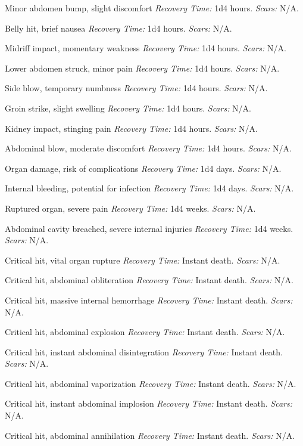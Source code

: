 \begin{description}[labelwidth=1.5em, leftmargin=*, itemsep=0.4em]
    \item[1 -] Minor abdomen bump, slight discomfort \textit{Recovery Time:} 1d4 hours. \textit{Scars:} N/A.
    \item[2 -] Belly hit, brief nausea \textit{Recovery Time:} 1d4 hours. \textit{Scars:} N/A.
    \item[3 -] Midriff impact, momentary weakness \textit{Recovery Time:} 1d4 hours. \textit{Scars:} N/A.
    \item[4 -] Lower abdomen struck, minor pain \textit{Recovery Time:} 1d4 hours. \textit{Scars:} N/A.
    \item[5 -] Side blow, temporary numbness \textit{Recovery Time:} 1d4 hours. \textit{Scars:} N/A.
    \item[6 -] Groin strike, slight swelling \textit{Recovery Time:} 1d4 hours. \textit{Scars:} N/A.
    \item[7 -] Kidney impact, stinging pain \textit{Recovery Time:} 1d4 hours. \textit{Scars:} N/A.
    \item[8 -] Abdominal blow, moderate discomfort \textit{Recovery Time:} 1d4 hours. \textit{Scars:} N/A.
    \item[9 -] Organ damage, risk of complications \textit{Recovery Time:} 1d4 days. \textit{Scars:} N/A.
    \item[10 -] Internal bleeding, potential for infection \textit{Recovery Time:} 1d4 days. \textit{Scars:} N/A.
    \item[11 -] Ruptured organ, severe pain \textit{Recovery Time:} 1d4 weeks. \textit{Scars:} N/A.
    \item[12 -] Abdominal cavity breached, severe internal injuries \textit{Recovery Time:} 1d4 weeks. \textit{Scars:} N/A.
    \item[13 -] Critical hit, vital organ rupture \textit{Recovery Time:} Instant death. \textit{Scars:} N/A.
    \item[14 -] Critical hit, abdominal obliteration \textit{Recovery Time:} Instant death. \textit{Scars:} N/A.
    \item[15 -] Critical hit, massive internal hemorrhage \textit{Recovery Time:} Instant death. \textit{Scars:} N/A.
    \item[16 -] Critical hit, abdominal explosion \textit{Recovery Time:} Instant death. \textit{Scars:} N/A.
    \item[17 -] Critical hit, instant abdominal disintegration \textit{Recovery Time:} Instant death. \textit{Scars:} N/A.
    \item[18 -] Critical hit, abdominal vaporization \textit{Recovery Time:} Instant death. \textit{Scars:} N/A.
    \item[19 -] Critical hit, instant abdominal implosion \textit{Recovery Time:} Instant death. \textit{Scars:} N/A.
    \item[20 -] Critical hit, abdominal annihilation \textit{Recovery Time:} Instant death. \textit{Scars:} N/A.
\end{description}

